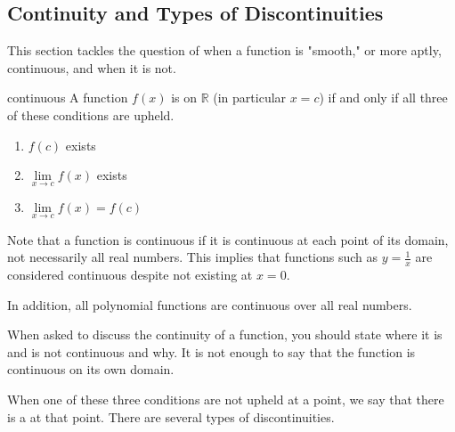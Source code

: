 \subsection{Continuity and Types of Discontinuities}

This section tackles the question of when a function is "smooth," or more aptly, continuous, and when it is not.

\begin{definition}{continuous}
    A function \( f \left( x \right) \) is  on \( \mathbb{R} \) (in particular \( x = c \)) if and only if all three of these conditions are upheld.
    
    \begin{enumerate}
        \item \( f \left( c \right) \) exists
        \item \( \lim\limits_{x \to c} f \left( x \right) \) exists
        \item \( \lim\limits_{x \to c} f \left( x \right) = f \left( c \right) \)
    \end{enumerate}
    
    Note that a function is continuous if it is continuous at each point of its domain, not necessarily all real numbers. This implies that functions such as \( y = \frac{1}{x} \) are considered continuous despite not existing at \( x = 0 \).
    
    \vspace{0.2cm}
    
    In addition, all polynomial functions are continuous over all real numbers.
\end{definition}

\begin{tip}
    When asked to discuss the continuity of a function, you should state where it is and is not continuous and why. It is not enough to say that the function is continuous on its own domain.
\end{tip}

When one of these three conditions are not upheld at a point, we say that there is a  at that point. There are several types of discontinuities.


